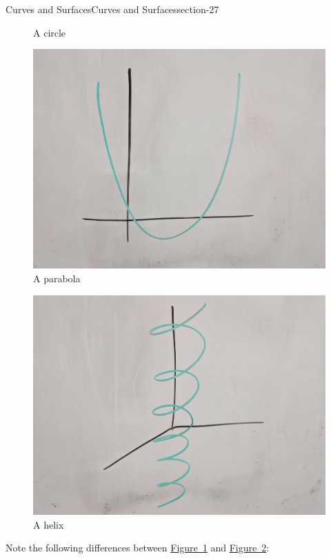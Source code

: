 \documentclass[oneside,10pt,]{article}
\begin{document}
\begin{sectionptx}{Curves and Surfaces}{}{Curves and Surfaces}{}{}{section-27}
\begin{figure}
\caption{A circle\label{figure-43}}
\end{figure}
\begin{figure}
\centering
\includegraphics[width=1\linewidth]{images/parabola.jpg}
\caption{A parabola\label{figure-46}}
\end{figure}
\begin{figure}
\centering
\includegraphics[width=1\linewidth]{images/helix.jpg}
\caption{A helix\label{figure-49}}
\end{figure}
\hypertarget{p-52}{}%
Note the following differences between \hyperref[figure-43]{Figure~\ref{figure-43}} and \hyperref[figure-46]{Figure~\ref{figure-46}}:%
\leavevmode%
\begin{itemize}[label=\textbullet]

\end{itemize}
\end{sectionptx}
\end{document}
